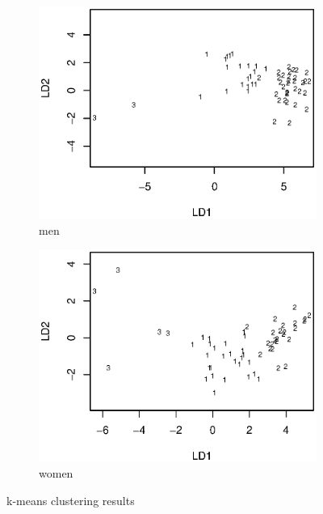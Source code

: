 \documentclass{article}
\begin{document}
\begin{itemize}[leftmargin = 0 em]
\begin{figure}[!htb]
          \begin{subfigure}[b]{0.5\linewidth}
            \centering
            \includegraphics[width = \textwidth]{men_km.eps}
            \caption{men}
          \end{subfigure}%
          \begin{subfigure}[b]{0.5\linewidth}
            \centering
            \includegraphics[width = \textwidth]{women_km.eps}
            \caption{women}
          \end{subfigure}
          \caption{k-means clustering results}
          \label{km}
\end{figure}


\end{itemize}
\end{document}
